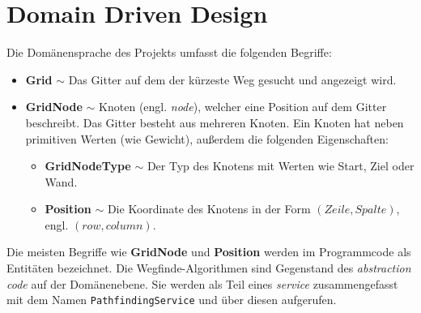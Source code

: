 \part{Domain Driven Design}
Die Domänensprache des Projekts umfasst die folgenden Begriffe:
\begin{itemize}
      \item \textbf{Grid} $\sim$ Das Gitter auf dem der kürzeste Weg gesucht und
            angezeigt wird.
      \item \textbf{GridNode} $\sim$ Knoten (engl. \textit{node}),
            welcher eine Position auf dem Gitter beschreibt. Das
            Gitter besteht aus mehreren Knoten. Ein Knoten hat neben
            primitiven Werten (wie Gewicht), außerdem die
            folgenden Eigenschaften:
            \begin{itemize}[topsep=0pt]
                  \item \textbf{GridNodeType} $\sim$ Der Typ des Knotens mit Werten
                        wie Start, Ziel oder Wand.
                  \item \textbf{Position} $\sim$ Die Koordinate des Knotens in der
                        Form $(Zeile,Spalte)$, engl. $(row,column)$.
            \end{itemize}
\end{itemize}
Die meisten Begriffe wie \textbf{GridNode} und \textbf{Position}
werden im Programmcode als Entitäten bezeichnet. Die
Wegfinde-Algorithmen sind Gegenstand des \textit{abstraction code} auf
der Domänenebene. Sie werden als Teil eines \textit{service}
zusammengefasst mit dem Namen \texttt{Path\-findingService} und
über diesen aufgerufen.